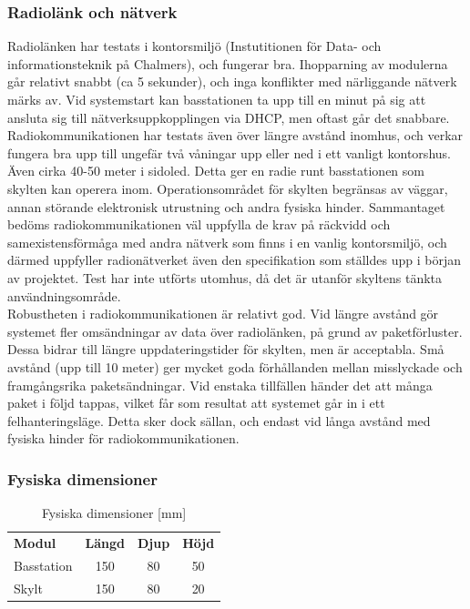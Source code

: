 \documentclass[a4paper,11pt]{article}
\begin{document}
\subsubsection{Radiolänk och nätverk}
Radiolänken har testats i kontorsmiljö (Instutitionen för Data- och informationsteknik på Chalmers), och fungerar bra. Ihopparning av modulerna går relativt snabbt (ca 5 sekunder), och inga konflikter med närliggande nätverk märks av. Vid systemstart kan basstationen ta upp till en minut på sig att ansluta sig till nätverksuppkopplingen via DHCP, men oftast går det snabbare. \\

Radiokommunikationen har testats även över längre avstånd inomhus, och verkar fungera bra upp till ungefär två våningar upp eller ned i ett vanligt kontorshus. Även cirka 40-50 meter i sidoled. Detta ger en radie runt basstationen som skylten kan operera inom. Operationsområdet för skylten begränsas av väggar, annan störande elektronisk utrustning och andra fysiska hinder. Sammantaget bedöms radiokommunikationen väl uppfylla de krav på räckvidd och samexistensförmåga med andra nätverk som finns i en vanlig kontorsmiljö, och därmed uppfyller radionätverket även den specifikation som ställdes upp i början av projektet. Test har inte utförts utomhus, då det är utanför skyltens tänkta användningsområde. \\

Robustheten i radiokommunikationen är relativt god. Vid längre avstånd gör systemet fler omsändningar av data över radiolänken, på grund av paketförluster. Dessa bidrar till längre uppdateringstider för skylten, men är acceptabla. Små avstånd (upp till 10 meter) ger mycket goda förhållanden mellan misslyckade och framgångsrika paketsändningar. Vid enstaka tillfällen händer det att många paket i följd tappas, vilket får som resultat att systemet går in i ett felhanteringsläge. Detta sker dock sällan, och endast vid långa avstånd med fysiska hinder för radiokommunikationen.

\subsubsection{Fysiska dimensioner}
\begin{table}[h]
\centering
	\begin{tabular}{|l|c|c|c|}
    {\bf Modul} & {\bf Längd} & {\bf Djup} & {\bf Höjd} \\
	Basstation & 150 & 80 & 50 \\
	Skylt & 150 & 80 & 20 \\
	\end{tabular}
\caption{Fysiska dimensioner [mm]}
\label{tab:dimensiontable}
\end{table}
\end{document}
